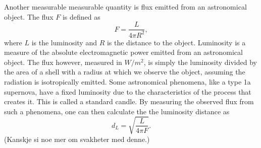 Another measurable measurable quantity is flux emitted from an astronomical object.
The flux $F$ is defined as
\begin{equation}
    F = \frac{L}{4\pi R^2},
\end{equation}
where $L$ is the luminosity and $R$ is the distance to the object. Luminosity is a measure
of the absolute electromagnetic power emitted from an astronomical object. The flux however, measured in $W/m^2$, is simply the luminosity
divided by the area of a shell with a radius at which we observe the object, assuming the radiation is isotropically emitted. Some astronomical phenomena, like a type 1a supernova, have a fixed luminosity
due to the characteristics of the process that creates it. This is called a standard candle. By measuring the observed flux from such a phenomena, one can then
calculate the the luminosity distance as 
\begin{equation}
    d_L = \sqrt{\frac{L}{4\pi F}}.
\end{equation}
(Kanskje si noe mer om svakheter med denne.)


